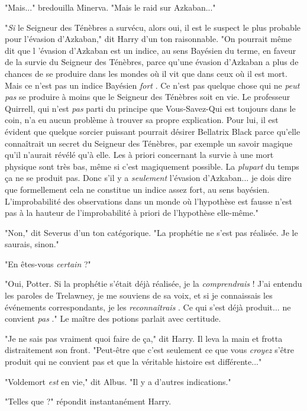 "Mais..." bredouilla Minerva. "Mais le raid sur Azkaban..."

"\emph{Si}  le Seigneur des Ténèbres a survécu, alors oui, il est le suspect le plus probable pour l'évasion d'Azkaban," dit Harry d'un ton raisonnable. "On pourrait même dit que l 'évasion d'Azkaban est un indice, au sens Bayésien du terme, en faveur de la survie du Seigneur des Ténèbres, parce qu'une évasion d'Azkaban a plus de chances de se produire dans les mondes où il vit que dans ceux où il est mort. Mais ce n'est pas un indice Bayésien \emph{fort} . Ce n'est pas quelque chose qui ne \emph{peut pas}  se produire à moins que le Seigneur des Ténèbres soit en vie. Le professeur Quirrell, qui n'est \emph{pas}  parti du principe que Vous-Savez-Qui est toujours dans le coin, n'a eu aucun problème à trouver sa propre explication. Pour lui, il est évident que quelque sorcier puissant pourrait désirer Bellatrix Black parce qu'elle connaîtrait un secret du Seigneur des Ténèbres, par exemple un savoir magique qu'il n'aurait révélé qu'à elle. Les à priori concernant la survie à une mort physique sont très bas, même si c'est magiquement possible. La \emph{plupart}  du temps ça ne se produit pas. Donc s'il y a \emph{seulement}  l'évasion d'Azkaban... je dois dire que formellement cela ne constitue un indice assez fort, au sens bayésien. L'improbabilité des observations dans un monde où l'hypothèse est fausse n'est pas à la hauteur de l'improbabilité à priori de l'hypothèse elle-même."

"Non," dit Severus d'un ton catégorique. "La prophétie ne s'est pas réalisée. Je le saurais, sinon."

"En êtes-vous \emph{certain } ?"

"Oui, Potter. Si la prophétie s'était déjà réalisée, je la \emph{comprendrais } ! J'ai entendu les paroles de Trelawney, je me souviens de sa voix, et si je connaissais les événements correspondants, je les \emph{reconnaîtrais} . Ce qui s'est déjà produit... ne convient \emph{pas} ." Le maître des potions parlait avec certitude.

"Je ne sais pas vraiment quoi faire de ça," dit Harry. Il leva la main et frotta distraitement son front. "Peut-être que c'est seulement ce que vous \emph{croyez}  s'être produit qui ne convient pas et que la véritable histoire est différente..."

"Voldemort \emph{est } en vie," dit Albus. "Il y a d'autres indications."

"Telles que ?" répondit instantanément Harry.

